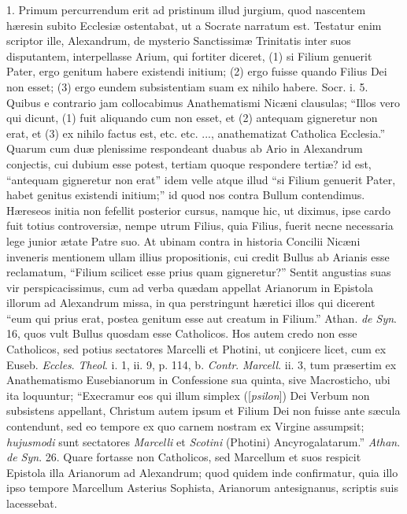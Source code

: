 1. Primum
percurrendum erit ad pristinum illud jurgium, quod nascentem hæresin
subito Ecclesiæ ostentabat, ut a Socrate narratum est. Testatur enim
scriptor ille, Alexandrum, de mysterio Sanctissimæ Trinitatis inter
suos disputantem, interpellasse Arium, qui fortiter diceret, (1) si
Filium genuerit Pater, ergo genitum habere existendi initium; (2) ergo
fuisse quando Filius Dei non esset; (3) ergo eundem subsistentiam suam
ex nihilo habere. Socr. i. 5. Quibus e contrario jam collocabimus
Anathematismi Nicæni clausulas; ``Illos vero qui dicunt, (1) fuit
aliquando cum non esset, et (2) antequam gigneretur non erat, et (3)
ex nihilo factus est, etc. etc. ..., anathematizat Catholica
Ecclesia.'' Quarum cum duæ plenissime respondeant duabus ab
Ario in Alexandrum conjectis, cui dubium esse potest, tertiam quoque
respondere tertiæ? id est, ``antequam gigneretur non erat'' idem
velle atque illud ``si Filium genuerit Pater, habet genitus existendi
initium;'' id quod nos contra Bullum contendimus. Hæreseos initia
non fefellit posterior cursus, namque hic, ut diximus, ipse cardo fuit
totius controversiæ, nempe utrum Filius, quia Filius, fuerit necne
necessaria lege junior ætate Patre suo. At ubinam contra in historia
Concilii Nicæni inveneris mentionem ullam illius propositionis, cui
credit Bullus ab Arianis esse reclamatum, ``Filium scilicet esse
prius quam gigneretur?'' Sentit angustias suas vir perspicacissimus,
cum ad verba quædam appellat Arianorum in Epistola illorum ad
Alexandrum missa, in qua perstringunt hæretici illos qui dicerent ``eum qui prius erat, postea genitum esse aut creatum in
Filium.'' Athan. \emph{de Syn}. 16, quos vult Bullus quosdam esse Catholicos.
Hos autem credo non esse Catholicos, sed potius sectatores Marcelli et
Photini, ut conjicere licet, cum ex Euseb. \emph{Eccles}. \emph{Theol}.
i. 1, ii. 9, p. 114, b. \emph{Contr}. \emph{Marcell}. ii. 3, tum præsertim
ex Anathematismo Eusebianorum in Confessione sua quinta, sive
Macrosticho, ubi ita loquuntur; ``Execramur eos qui illum simplex ([\emph{psilon}])
Dei Verbum non subsistens appellant, Christum autem ipsum et Filium
Dei non fuisse ante sæcula contendunt, sed eo tempore ex quo carnem
nostram ex Virgine assumpsit; \emph{hujusmodi} sunt sectatores \emph{Marcelli}
et \emph{Scotini} (Photini) Ancyrogalatarum.'' \emph{Athan}. \emph{de
Syn}. 26. Quare fortasse non Catholicos, sed Marcellum et suos
respicit Epistola illa Arianorum ad Alexandrum; quod quidem inde
confirmatur, quia illo ipso tempore Marcellum Asterius Sophista,
Arianorum antesignanus, scriptis suis lacessebat.

